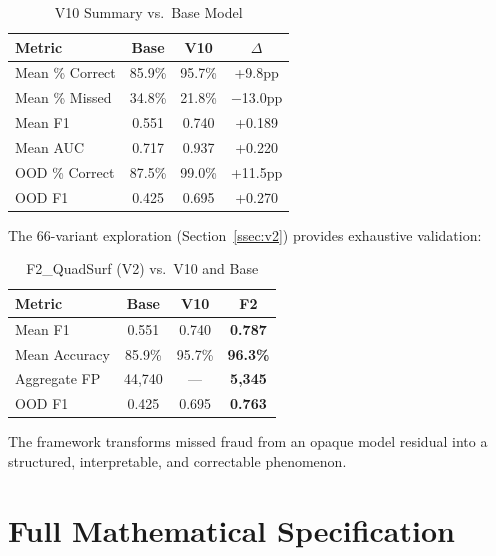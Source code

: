 \documentclass[journal]{IEEEtran}
\begin{document}
\begin{table}[!t]
\centering
\caption{V10 Summary vs.\ Base Model}
\label{tab:v10_summary}
\begin{tabular}{@{}lccc@{}}
\toprule
\textbf{Metric} & \textbf{Base} & \textbf{V10} & $\Delta$ \\
\midrule
Mean \% Correct    & 85.9\% & 95.7\% & +9.8pp \\
Mean \% Missed     & 34.8\% & 21.8\% & $-$13.0pp \\
Mean F1            & 0.551  & 0.740  & +0.189 \\
Mean AUC           & 0.717  & 0.937  & +0.220 \\
OOD \% Correct     & 87.5\% & 99.0\% & +11.5pp \\
OOD F1             & 0.425  & 0.695  & +0.270 \\
\bottomrule
\end{tabular}
\end{table}

The 66-variant exploration (Section~\ref{ssec:v2}) provides exhaustive validation:

\begin{table}[!t]
\centering
\caption{F2\_QuadSurf (V2) vs.\ V10 and Base}
\label{tab:v2_summary}
\begin{tabular}{@{}lccc@{}}
\toprule
\textbf{Metric} & \textbf{Base} & \textbf{V10} & \textbf{F2} \\
\midrule
Mean F1       & 0.551  & 0.740  & \textbf{0.787} \\
Mean Accuracy & 85.9\% & 95.7\% & \textbf{96.3\%} \\
Aggregate FP  & 44{,}740 & ---  & \textbf{5{,}345} \\
OOD F1        & 0.425  & 0.695  & \textbf{0.763} \\
\bottomrule
\end{tabular}
\end{table}

The framework transforms missed fraud from an opaque model residual into a structured, interpretable, and correctable phenomenon.




\appendices

\section{Full Mathematical Specification}
\label{app:math}
\end{document}
